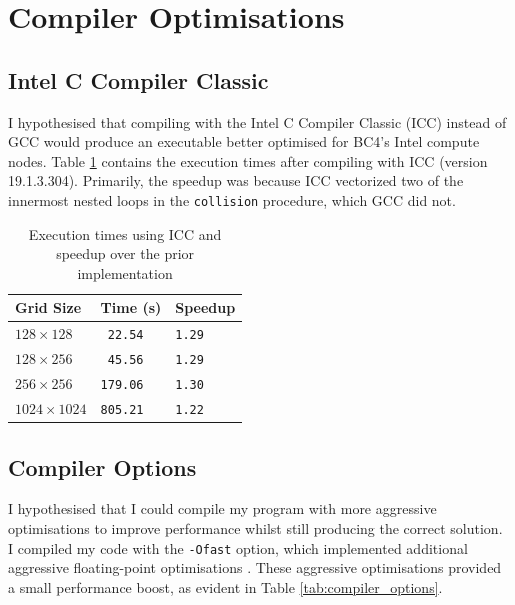 \documentclass[twocolumn, a4paper]{article}
\begin{document}
\section{Compiler Optimisations}


\subsection{Intel C Compiler Classic}

I hypothesised that compiling with the Intel C Compiler Classic (ICC) instead of GCC would produce an executable better optimised for BC4's Intel compute nodes.
Table \ref{tab:icc} contains the execution times after compiling with ICC (version 19.1.3.304).
Primarily, the speedup was because ICC vectorized two of the innermost nested loops in the \texttt{collision} procedure, which GCC did not. 

\begin{table}[htbp]
  \begin{center}
  \caption{Execution times using ICC and speedup over the prior implementation}\label{tab:icc}
  \begin{tabular}[t]{l | l l} 
      \hline\hline
      Grid Size&Time (s)&Speedup\\
      \hline
      $128 \times 128$&\texttt{ 22.54}&\texttt{1.29}\\
      $128 \times 256$&\texttt{ 45.56}&\texttt{1.29}\\
      $256 \times 256$&\texttt{179.06}&\texttt{1.30}\\
      $1024 \times 1024$&\texttt{805.21}&\texttt{1.22}\\
      \hline
    \end{tabular}
  \end{center}
  \vspace{-1em}
\end{table}

\subsection{Compiler Options}

I hypothesised that I could compile my program with more aggressive optimisations to improve performance whilst still producing the correct solution.
I compiled my code with the \texttt{-Ofast} option, which implemented additional aggressive floating-point optimisations \cite{icc}.
These aggressive optimisations provided a small performance boost, as evident in Table \ref{tab:compiler_options}.
\end{document}

